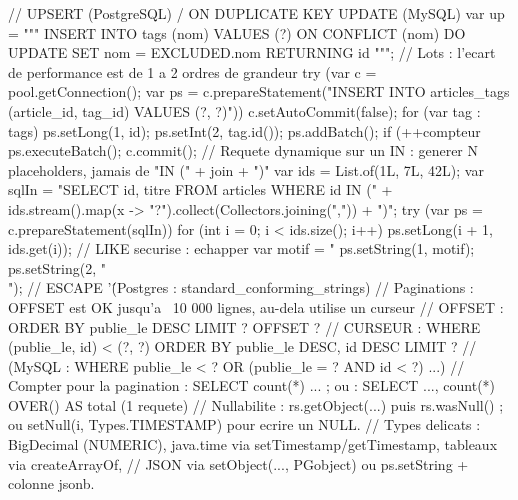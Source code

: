 \begin{codejava}
// UPSERT (PostgreSQL) / ON DUPLICATE KEY UPDATE (MySQL)
var up = """
        INSERT INTO tags (nom) VALUES (?) ON CONFLICT (nom) DO UPDATE SET nom = EXCLUDED.nom RETURNING id
        """;
// Lots : l'ecart de performance est de 1 a 2 ordres de grandeur
try (var c = pool.getConnection(); var ps = c.prepareStatement("INSERT INTO articles_tags (article_id, tag_id) VALUES (?, ?)")) {
    c.setAutoCommit(false);
    for (var tag : tags) {
        ps.setLong(1, id); ps.setInt(2, tag.id());
        ps.addBatch();
        if (++compteur %
    }
    ps.executeBatch();
    c.commit();
}
// Requete dynamique sur un IN : generer N placeholders, jamais de "IN (" + join + ")"
var ids = List.of(1L, 7L, 42L);
var sqlIn = "SELECT id, titre FROM articles WHERE id IN (" +
        ids.stream().map(x -> "?").collect(Collectors.joining(",")) + ")";
try (var ps = c.prepareStatement(sqlIn)) {
    for (int i = 0; i < ids.size(); i++) { ps.setLong(i + 1, ids.get(i)); }
}
// LIKE securise : echapper %
var motif = "%
ps.setString(1, motif);
ps.setString(2, "\\");                       // ESCAPE '\' (Postgres : standard_conforming_strings)
// Paginations : OFFSET est OK jusqu'a ~10 000 lignes, au-dela utilise un curseur
//   OFFSET :   ORDER BY publie_le DESC LIMIT ? OFFSET ?
//   CURSEUR :  WHERE (publie_le, id) < (?, ?) ORDER BY publie_le DESC, id DESC LIMIT ?
//   (MySQL : WHERE publie_le < ? OR (publie_le = ? AND id < ?) ...)
// Compter pour la pagination : SELECT count(*) ... ; ou : SELECT ..., count(*) OVER() AS total (1 requete)
// Nullabilite : rs.getObject(...) puis rs.wasNull() ; ou setNull(i, Types.TIMESTAMP) pour ecrire un NULL.
// Types delicats : BigDecimal (NUMERIC), java.time via setTimestamp/getTimestamp, tableaux via createArrayOf,
// JSON via setObject(..., PGobject) ou ps.setString + colonne jsonb.
\end{codejava}

